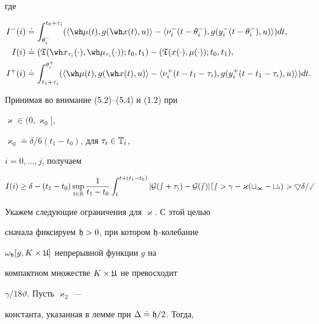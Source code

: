 где


\begin{align*}


I^-(i)&\doteq\int_{\theta_i^-}^{t_0+\tau_i}


(\langle\wh\mu(t),g(\wh x(t),u)\rangle -


\langle\nu_i^-(t-\theta_i^-),g(y_i^-(t-\theta_i^-),u)\rangle )dt,\\


I(i)&\doteq(\frak T(\wh x_{\tau_i}(\cdot),\wh \mu_{\tau_i}(\cdot));t_0,t_1)-


(\frak T(x(\cdot),\mu(\cdot));t_0,t_1),\\


I^+(i)&\doteq\int_{t_1+\tau_i}^{\theta_i^+}


(\langle\wh\mu(t),g(\wh x(t),u)\rangle-


\langle\nu_i^+(t-t_1-\tau_i),g(y_i^+(t-t_1-\tau_i),u)\rangle)dt.


\end{align*}





Принимая во внимание (5.2)--(5.4) и (1.2) при


$\varkappa\in(0,\varkappa_0]$,


$\varkappa_0\doteq\delta/6(t_1-t_0)$, для $\tau_i\in\Bbb T_i$,


$i=0,\dotsc,j$, получаем 


\begin{equation}


I(i)\ge\delta-(t_1-t_0)


\sup_{t\in\bR}\frac{1}{t_1-t_0}\int_t^{t+(t_1-t_0)}


|\cal G(s+\tau_i)-\cal G(s)|ds>\gamma-{\varkappa}(t_1-t_0)>


5\delta/6.


\end{equation}





Укажем следующие ограничения для $\varkappa$. С этой целью


сначала фиксируем $\frak h>0$, при котором $\frak h$-колебание


$\omega_{\frak h}[g,K\times\frak U]$ непрерывной функции $g$ на


компактном множестве $K\times\frak U$ не превосходит


$\gamma/18\vartheta$. Пусть $\varkappa_2$ ---


константа, указанная в лемме при $\Delta\doteq\frak h/2$. Тогда,


